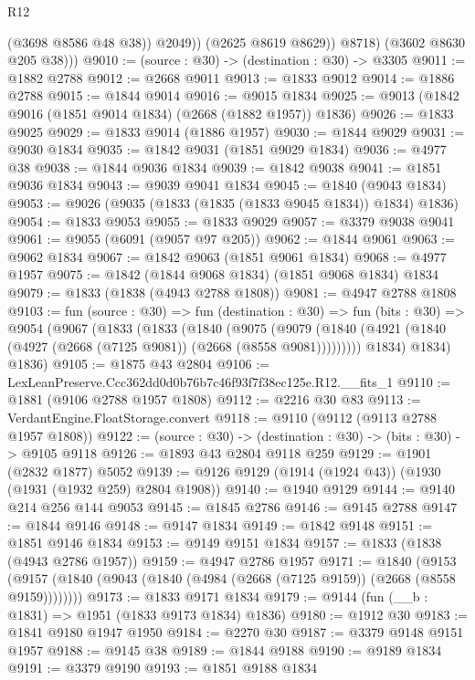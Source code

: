 \begin{lexlean}{R12}
\begin{coremodule}
                  (@3698 @8586 @48 @38))
                @2049))
            (@2625 @8619 @8629))
          @8718)
        (@3602 @8630 @205 @38)))
@9010 := (source : @30) -> (destination : @30) -> @3305
@9011 := @1882 @2788
@9012 := @2668 @9011
@9013 := @1833 @9012
@9014 := @1886 @2788
@9015 := @1844 @9014
@9016 := @9015 @1834
@9025 := @9013 (@1842 @9016 (@1851 @9014 @1834) (@2668 (@1882 @1957)) @1836)
@9026 := @1833 @9025
@9029 := @1833 @9014 (@1886 @1957)
@9030 := @1844 @9029
@9031 := @9030 @1834
@9035 := @1842 @9031 (@1851 @9029 @1834)
@9036 := @4977 @38
@9038 := @1844 @9036 @1834
@9039 := @1842 @9038
@9041 := @1851 @9036 @1834
@9043 := @9039 @9041 @1834
@9045 := @1840 (@9043 @1834)
@9053 := @9026 (@9035 (@1833 (@1835 (@1833 @9045 @1834)) @1834) @1836)
@9054 := @1833 @9053
@9055 := @1833 @9029
@9057 := @3379 @9038 @9041
@9061 := @9055 (@6091 (@9057 @97 @205))
@9062 := @1844 @9061
@9063 := @9062 @1834
@9067 := @1842 @9063 (@1851 @9061 @1834)
@9068 := @4977 @1957
@9075 := @1842 (@1844 @9068 @1834) (@1851 @9068 @1834) @1834
@9079 := @1833 (@1838 (@4943 @2788 @1808))
@9081 := @4947 @2788 @1808
@9103 := fun (source : @30) =>
  fun (destination : @30) =>
  fun (bits : @30) =>
  @9054
    (@9067
      (@1833
        (@1833
          (@1840
            (@9075
              (@9079 (@1840 (@4921 (@1840 (@4927 (@2668 (@7125 @9081)) (@2668 (@8558 @9081)))))))))
          @1834)
        @1834)
      @1836)
@9105 := @1875 @43 @2804
@9106 := LexLeanPreserve.Ccc362dd0d0b76b7c46f93f7f38ec125e.R12.__fits_1
@9110 := @1881 (@9106 @2788 @1957 @1808)
@9112 := @2216 @30 @83
@9113 := VerdantEngine.FloatStorage.convert
@9118 := @9110 (@9112 (@9113 @2788 @1957 @1808))
@9122 := (source : @30) -> (destination : @30) -> (bits : @30) -> @9105 @9118
@9126 := @1893 @43 @2804 @9118 @259
@9129 := @1901 (@2832 @1877) @5052
@9139 := @9126 @9129 (@1914 (@1924 @43)) (@1930 (@1931 (@1932 @259) @2804 @1908))
@9140 := @1940 @9129
@9144 := @9140 @214 @256 @144 @9053
@9145 := @1845 @2786
@9146 := @9145 @2788
@9147 := @1844 @9146
@9148 := @9147 @1834
@9149 := @1842 @9148
@9151 := @1851 @9146 @1834
@9153 := @9149 @9151 @1834
@9157 := @1833 (@1838 (@4943 @2786 @1957))
@9159 := @4947 @2786 @1957
@9171 := @1840
    (@9153 (@9157 (@1840 (@9043 (@1840 (@4984 (@2668 (@7125 @9159)) (@2668 (@8558 @9159))))))))
@9173 := @1833 @9171 @1834
@9179 := @9144 (fun (__b : @1831) => @1951 (@1833 @9173 @1834) @1836)
@9180 := @1912 @30
@9183 := @1841 @9180 @1947 @1950
@9184 := @2270 @30
@9187 := @3379 @9148 @9151 @1957
@9188 := @9145 @38
@9189 := @1844 @9188
@9190 := @9189 @1834
@9191 := @3379 @9190
@9193 := @1851 @9188 @1834

\end{coremodule}
\end{lexlean}
